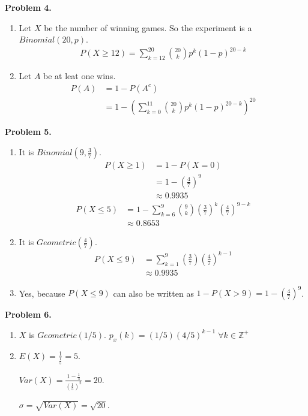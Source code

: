 \documentclass{article}
\begin{document}
\textbf{Problem 4.}
\begin{enumerate}[label={(\alph*)}]
    \item 
    Let $X$ be the number of winning games. So the experiment is a $Binomial(20, p)$.
    \begin{align}
        P(X \ge 12) = \sum_{k=12}^{20} {20 \choose k}p^k(1-p)^{20-k}
    \end{align}

    \item 
    Let $A$ be at leat one wins.
    \begin{align}
        P(A) & = 1-P(A^c) \\
        & = 1- \left(\sum_{k=0}^{11} {20 \choose k}p^k(1-p)^{20-k}\right)^{20} 
    \end{align}
\end{enumerate}
\pagebreak

\textbf{Problem 5.}
\begin{enumerate}[label={(\alph*)}]
    \item It is $Binomial(9, \frac{3}{7})$.
    \begin{align}
        P(X \ge 1) & = 1-P(X=0) \\
        & = 1- \left(\frac{4}{7}\right)^9 \\ 
        & \approx 0.9935 
    \end{align}
    \begin{align}
        P(X \le 5) & = 1 - \sum_{k=6}^{9}{9\choose k}\left(\frac{3}{7}\right)^k \left(\frac{4}{7}\right)^{9-k} \\
        & \approx 0.8653
    \end{align}

    \item It is $Geometric(\frac{4}{7})$.
    \begin{align}
        P(X \le 9) & = \sum_{k = 1}^{9}\left(\frac{3}{7}\right)\left(\frac{4}{7}\right)^{k-1} \\
        & \approx 0.9935 
    \end{align}

    \item 
    Yes, because $P(X \le 9)$ can also be written as $1 - P(X>9) = 1-\left(\frac{4}{7}\right)^9$.
\end{enumerate}
\bigbreak

\textbf{Problem 6.}
\begin{enumerate}[label={(\alph*)}]
    \item $X$ is $Geometric(1/5)$.
    $p_x(k)=(1/5)(4/5)^{k-1} \; \forall k \in \mathbb{Z}^+$

    \item 
    $E(X)=\frac{1}{\frac{1}{5}}=5$.

    $Var(X)=\frac{1-\frac{1}{5}}{\left(\frac{1}{5}\right)^2}=20$.

    $\sigma=\sqrt{Var(X)}=\sqrt{20}$.
\end{enumerate}
\bigbreak
\end{document}
